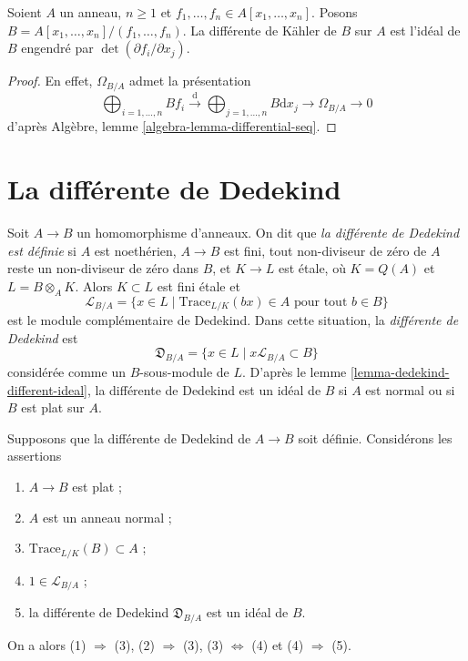 \begin{lemma}
\label{lemma-kahler-different-complete-intersection}
Soient $A$ un anneau, $n \geq 1$ et
$f_1, \ldots, f_n \in A[x_1, \ldots, x_n]$.
Posons $B = A[x_1, \ldots, x_n]/(f_1, \ldots, f_n)$.
La différente de Kähler de $B$ sur $A$ est l'idéal
de $B$ engendré par $\det(\partial f_i/\partial x_j)$.
\end{lemma}

\begin{proof}
En effet, $\Omega_{B/A}$ admet la présentation
$$
\bigoplus\nolimits_{i = 1, \ldots, n} B f_i
\xrightarrow{\text{d}}
\bigoplus\nolimits_{j = 1, \ldots, n} B \text{d}x_j
\rightarrow \Omega_{B/A} \rightarrow 0
$$
d'après Algèbre, lemme \ref{algebra-lemma-differential-seq}.
\end{proof}



\section{La différente de Dedekind}
\label{section-dedekind-different}

\noindent
Soit $A \to B$ un homomorphisme d'anneaux. On dit que {\it la différente de Dedekind est définie}
si $A$ est noethérien, $A \to B$ est fini,
tout non-diviseur de zéro de $A$ reste un non-diviseur de zéro dans $B$, et $K \to L$ est
étale, où $K = Q(A)$ et $L = B \otimes_A K$. Alors $K \subset L$ est
fini étale et
$$
\mathcal{L}_{B/A} = \{x \in L \mid \text{Trace}_{L/K}(bx) \in A
\text{ pour tout }b \in B\}
$$
est le module complémentaire de Dedekind. Dans cette situation, la
{\it différente de Dedekind} est
$$
\mathfrak{D}_{B/A} = \{x \in L \mid x\mathcal{L}_{B/A} \subset B\}
$$
considérée comme un $B$-sous-module de $L$.
D'après le lemme \ref{lemma-dedekind-different-ideal}, la différente de Dedekind est un
idéal de $B$ si $A$ est normal ou si $B$ est plat sur $A$.

\begin{lemma}
\label{lemma-dedekind-different-ideal}
Supposons que la différente de Dedekind de $A \to B$ soit définie. Considérons les assertions
\begin{enumerate}
\item $A \to B$ est plat ;
\item $A$ est un anneau normal ;
\item $\text{Trace}_{L/K}(B) \subset A$ ;
\item $1 \in \mathcal{L}_{B/A}$ ;
\item la différente de Dedekind $\mathfrak{D}_{B/A}$ est un idéal de $B$.
\end{enumerate}
On a alors (1) $\Rightarrow$ (3), (2) $\Rightarrow$ (3),
(3) $\Leftrightarrow$ (4) et (4) $\Rightarrow$ (5).
\end{lemma}

